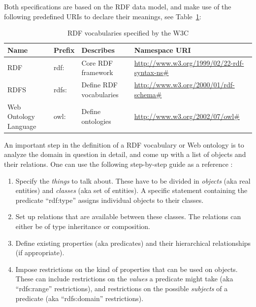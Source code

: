 Both specifications are based on the \gls{RDF} data model, and make use of the following predefined \gls{URI}s to declare their meanings, see Table~\ref{tab:w3c_vocab_rdf}: \@

\begin{table}[H]
\centering
\begin{tabular}{p{3cm}llp{4.5cm}}
\hline
\textbf{Name} & \textbf{Prefix} & \textbf{Describes} & \textbf{Namespace URI} \\
\hline
\gls{RDF} & rdf: & Core \gls{RDF} framework & \url{http://www.w3.org/1999/02/22-rdf-syntax-ns\#} \\
\hline
\gls{RDFS} & rdfs: & Define \gls{RDF} vocabularies & \url{http://www.w3.org/2000/01/rdf-schema\#} \\
\hline
Web Ontology Language & owl: & Define ontologies & \url{http://www.w3.org/2002/07/owl\#} \\
\hline
\end{tabular}
\caption[\gls{RDF} vocabularies specified by the \gls{W3C}]{\gls{RDF} vocabularies specified by the \gls{W3C} \citep[pg. 41]{wood2014linked}}
\label{tab:w3c_vocab_rdf}
\end{table}

An important step in the definition of a \gls{RDF} vocabulary or Web ontology is to analyze the domain in question in detail, and come up with a list of objects and their relations. One can use the following step-by-step guide as a reference \citep[pg. 88-94]{antoniou2008semantic}: \@

\begin{enumerate}
	\item Specify the \emph{things} to talk about. These have to be divided in \emph{objects} (aka real entities) and \emph{classes} (aka set of entities). A specific statement containing the predicate ``rdf:type'' assigns individual objects to their classes.
	\item Set up relations that are available between these classes. The relations can either be of type inheritance or composition.
	\item Define existing properties (aka predicates) and their hierarchical relationships (if appropriate).
	\item Impose restrictions on the kind of properties that can be used on objects. These can include restrictions on the \emph{values} a predicate might take (aka ``rdfs:range'' restrictions), and restrictions on the possible \emph{subjects} of a predicate (aka ``rdfs:domain'' restrictions).
\end{enumerate}

